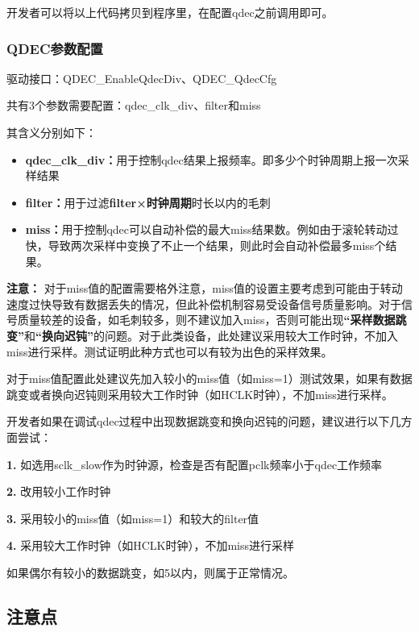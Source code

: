 \documentclass[
  12pt,
]{book}
\begin{document}
开发者可以将以上代码拷贝到程序里，在配置qdec之前调用即可。

\hypertarget{qdecux53c2ux6570ux914dux7f6e}{%
\subsubsection{QDEC参数配置}\label{qdecux53c2ux6570ux914dux7f6e}}

驱动接口：QDEC\_EnableQdecDiv、QDEC\_QdecCfg

共有3个参数需要配置：qdec\_clk\_div、filter和miss

其含义分别如下：

\begin{itemize}
\item
  \textbf{qdec\_clk\_div：}用于控制qdec结果上报频率。即多少个时钟周期上报一次采样结果
\item
  \textbf{filter：}用于过滤\textbf{filter×时钟周期}时长以内的毛刺
\item
  \textbf{miss：}用于控制qdec可以自动补偿的最大miss结果数。例如由于滚轮转动过快，导致两次采样中变换了不止一个结果，则此时会自动补偿最多miss个结果。
\end{itemize}

\textbf{注意：} 对于miss值的配置需要格外注意，miss值的设置主要考虑到可能由于转动速度过快导致有数据丢失的情况，但此补偿机制容易受设备信号质量影响。对于信号质量较差的设备，如毛刺较多，则不建议加入miss，否则可能出现\textbf{``采样数据跳变''}和\textbf{``换向迟钝''}的问题。对于此类设备，此处建议采用较大工作时钟，不加入miss进行采样。测试证明此种方式也可以有较为出色的采样效果。

对于miss值配置此处建议先加入较小的miss值（如miss=1）测试效果，如果有数据跳变或者换向迟钝则采用较大工作时钟（如HCLK时钟），不加miss进行采样。

开发者如果在调试qdec过程中出现数据跳变和换向迟钝的问题，建议进行以下几方面尝试：

\textbf{1.} 如选用sclk\_slow作为时钟源，检查是否有配置pclk频率小于qdec工作频率

\textbf{2.} 改用较小工作时钟

\textbf{3.} 采用较小的miss值（如miss=1）和较大的filter值

\textbf{4.} 采用较大工作时钟（如HCLK时钟），不加miss进行采样

如果偶尔有较小的数据跳变，如5以内，则属于正常情况。

\hypertarget{ux6ce8ux610fux70b9-5}{%
\subsection{注意点}\label{ux6ce8ux610fux70b9-5}}
\end{document}
